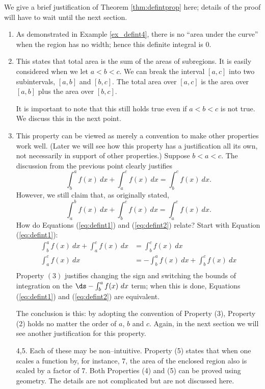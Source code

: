 We give a brief justification of Theorem \ref{thm:defintprop} here; details of the proof will have to wait until the next section.
		\begin{enumerate}
		\item		As demonstrated in Example \ref{ex_defint4}, there is no ``area under the curve'' when the region has no width; hence this definite integral is 0.
		\item		This states that total area is the sum of the areas of subregions. It is easily considered when we let $a<b<c$. We can break the interval $[a,c]$ into two subintervals, $[a,b]$ and $[b,c]$. The total area over $[a,c]$ is the area over $[a,b]$ plus the area over $[b,c]$. 
		
		It is important to note that this still holds true even if $a<b<c$ is not true. We discuss this in the next point.
		\item		This property can be viewed as merely a convention to make other properties work well. (Later we will see how this property has a justification all its own, not necessarily in support of other properties.) Suppose $b<a<c$. The discussion from the previous point clearly justifies 
		\begin{equation}\int_b^a f(x)\ dx + \int_a^c f(x)\ dx = \int_b^c f(x)\ dx.\label{eq:defint1}\end{equation}
		However, we still claim that, as originally stated, 
		\begin{equation}\int_a^b f(x)\ dx + \int_b^c f(x)\ dx = \int_a^c f(x)\ dx.\label{eq:defint2}\end{equation}
		How do Equations (\ref{eq:defint1}) and (\ref{eq:defint2}) relate? Start with Equation (\ref{eq:defint1}):
		\begin{align*}
		\int_b^a f(x)\ dx + \int_a^c f(x)\ dx &= \int_b^c f(x)\ dx\\
		\int_a^c f(x)\ dx &= -\int_b^a f(x)\ dx + \int_b^c f(x)\ dx\\
		\end{align*}
Property $(3)$ justifies changing the sign and switching the bounds of integration on the $\ds -\int_b^a f(x)\ dx$ term; when this is done, Equations (\ref{eq:defint1}) and (\ref{eq:defint2}) are equivalent.

The conclusion is this: by adopting the convention of Property (3), Property (2) holds no matter the order of $a$, $b$ and $c$. Again, in the next section we will see another justification for this property.
	\item[4,5.]	Each of these may be non--intuitive. Property (5) states that when one scales a function by, for instance, 7, the area of the enclosed region also is scaled by a factor of 7. Both Properties (4) and (5)  can be proved using geometry. The details are not complicated but are not discussed here.
\end{enumerate}

